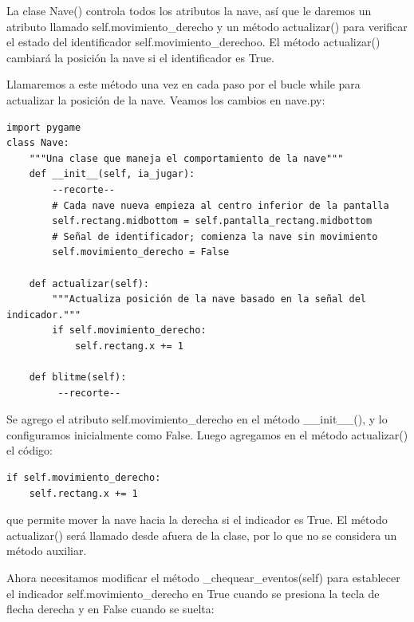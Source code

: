 La clase {\ttfamily Nave()} controla todos los atributos la nave, así que le daremos un atributo
llamado  {\ttfamily  self.movimiento\_derecho} y un método  {\ttfamily actualizar()} para verificar el estado del identificador 
{\ttfamily  self.movimiento\_derechoo}. El método  {\ttfamily actualizar()} cambiará la posición la nave si el 
 identificador es  {\ttfamily True}. 
 
Llamaremos a este método una vez en cada paso por el bucle while para actualizar la posición de la nave.
Veamos los cambios en  {\ttfamily nave.py}:

\hspace{-2.0cm}{\ttfamily \scriptsize nave.py}  \vspace{-0.5cm}
\begin{lstlisting}
import pygame
class Nave:
    """Una clase que maneja el comportamiento de la nave"""
    def __init__(self, ia_jugar):
        --recorte--
        # Cada nave nueva empieza al centro inferior de la pantalla
        self.rectang.midbottom = self.pantalla_rectang.midbottom    
        # Señal de identificador; comienza la nave sin movimiento
        self.movimiento_derecho = False

    def actualizar(self):
        """Actualiza posición de la nave basado en la señal del indicador."""
        if self.movimiento_derecho:
            self.rectang.x += 1

    def blitme(self):
         --recorte--	
\end{lstlisting}



Se agrego el atributo {\ttfamily self.movimiento\_derecho} en el método {\ttfamily \_\_init\_\_()}, y lo configuramos inicialmente como {\ttfamily False}. Luego agregamos en el método {\ttfamily actualizar()}   el código:
\begin{lstlisting}		
if self.movimiento_derecho:
    self.rectang.x += 1	
\end{lstlisting}
que permite mover la nave hacia la derecha si el indicador es {\ttfamily True}. El método  {\ttfamily actualizar()} será  llamado desde afuera de la clase, por lo que no se considera un método auxiliar. 

Ahora necesitamos modificar el método {\ttfamily \_chequear\_eventos(self)} para establecer  el indicador  {\ttfamily self.movimiento\_derecho}  en {\ttfamily True} cuando se presiona  la tecla de flecha derecha y en {\ttfamily False} cuando se suelta:

